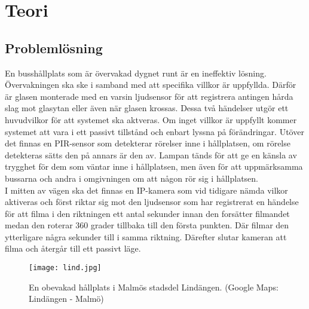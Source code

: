 
\chapter{Teori} %
\label{teori}

\ifpdf
    \graphicspath{{3_theory/figures/PNG/}{3/figures/PDF/}{3/figures/}}
\else
    \graphicspath{{3_theory/figures/EPS/}{3/figures/}}
\fi

\graphicspath{{3_theory/figures/}{3/figures/}}


\section{Problemlösning}

En busshållplats som är övervakad dygnet runt är en ineffektiv lösning. Övervakningen ska ske i samband med att specifika villkor är uppfyllda. Därför är glasen monterade med en varsin ljudsensor för att registrera antingen hårda slag mot glasytan eller även när glasen krossas. Dessa två händelser utgör ett huvudvilkor för att systemet ska aktveras. Om inget villkor är uppfyllt kommer systemet att vara i ett passivt tillstånd och enbart lyssna på förändringar. Utöver det finnas en PIR-sensor som detekterar rörelser inne i hållplatsen, om rörelse detekteras sätts den på annars är den av. Lampan tänds för att ge en känsla av trygghet för dem som väntar inne i hållplatsen, men även för att uppmärksamma bussarna och andra i omgivningen om att någon rör sig i hållplatsen. \\

I mitten av vägen ska det finnas en IP-kamera som vid tidigare nämda vilkor aktiveras och först riktar sig mot den ljudsensor som har registrerat en händelse för att filma i den riktningen ett antal sekunder innan den forsätter filmandet medan den roterar 360 grader tillbaka till den första punkten. Där filmar den ytterligare några sekunder till i samma riktning. Därefter slutar kameran att filma och återgår till ett passivt läge.

\begin{figure}[h]
  \texttt{[image: lind.jpg]}
  \caption{En obevakad hållplats i Malmös stadsdel Lindängen. (Google Maps: Lindängen - Malmö)}
  \label{fig:lind}
\end{figure}





